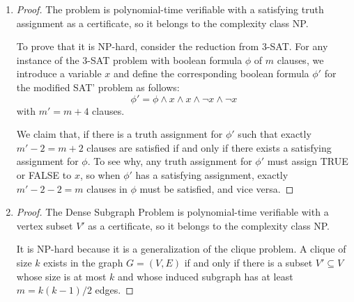 \documentclass{article}
\begin{document}
\begin{enumerate}
\begin{proof}
        When $\phi'$ has a satisfying assignment, $x$ must be TRUE. Otherwise, the $(15q - k)$ $A$ clauses would not be satisfied. All the remaining $(k + q)$ clauses account for less than $15k'/16 = 15q$ clauses, as proved below:
        \begin{align*}
            k + q &= 15q + k - 14q\\
            &= 15q + k - 14\left(\left\lfloor\frac{k}{14}\right\rfloor + 1\right)\\
            &= 15q - 14\left(\left\lfloor\frac{k}{14}\right\rfloor + 1 - \frac{k}{14}\right)\\
            &\le 15q,
        \end{align*}
        contradicting the existence of a satisfying assignment for $\phi'$.
        Because $x$ must be TRUE when there exists a assignment that satisfies at least $15k'/16$ clauses, and the $q$ $A_\textrm{neg}$ clauses are all FALSE when $x$ is TRUE, the boolean formula $\phi$ and the $15q - k$ $A$ clauses must be all satisfied, demonstrating the existence of a satisfying assignment for $\phi$.
    \end{proof}
    \item \begin{proof}
        The problem is polynomial-time verifiable with a satisfying truth assignment as a certificate, so it belongs to the complexity class NP.

        To prove that it is NP-hard, consider the reduction from 3-SAT. For any instance of the 3-SAT problem with boolean formula $\phi$ of $m$ clauses, we introduce a variable $x$ and define the corresponding boolean formula $\phi'$ for the modified SAT' problem as follows:
        \[
            \phi' = \phi \land x \land x \land \neg x \land \neg x
        \]
        with $m' = m + 4$ clauses.
        
        We claim that, if there is a truth assignment for $\phi'$ such that exactly $m' - 2 = m + 2$ clauses are satisfied if and only if there exists a satisfying assignment for $\phi$. To see why, any truth assignment for $\phi'$ must assign TRUE or FALSE to $x$, so when $\phi'$ has a satisfying assignment, exactly $m' - 2 - 2 = m$ clauses in $\phi$ must be satisfied, and vice versa.
    \end{proof}

    \item \begin{proof}
        The Dense Subgraph Problem is polynomial-time verifiable with a vertex subset $V'$ as a certificate, so it belongs to the complexity class NP.

        It is NP-hard because it is a generalization of the clique problem. A clique of size $k$ exists in the graph $G = (V, E)$ if and only if there is a subset $V' \subseteq V$ whose size is at most $k$ and whose induced subgraph has at least $m = k(k - 1)/2$ edges.
    \end{proof}
\end{enumerate}
\end{document}
